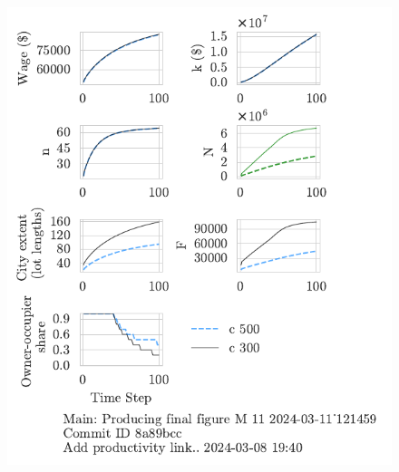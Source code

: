 
\begin{figure}[h!tb] 
    \centering
    \includegraphics[scale=.75, trim={0 1.4cm 1.5cm 0},clip]{fig/c-Main-121459.pdf} 

\end{figure}
